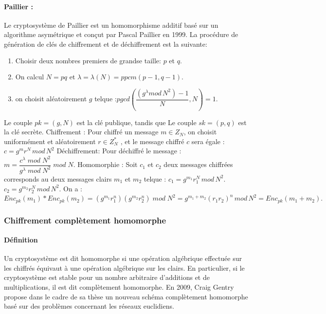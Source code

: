 \documentclass[a4paper,12pt]{article}
\begin{document}
\paragraph{Paillier : }
Le cryptosystème de Paillier est un homomorphisme additif basé sur un algorithme asymétrique et conçut par Pascal Paillier en 1999.\newline
La procédure de génération de clés de chiffrement et de déchiffrement est la suivante:
\begin{enumerate}
\item Choisir deux nombres premiers de grandse taille: $p$   et $q$.
\item  On calcul $N=pq$ \newline et $\lambda =\lambda(N) = ppcm(p-1, q-1)$.
\item  on choisit aléatoirement $g$ telque :\newline $pgcd(\dfrac{(g^\lambda mod\, N^2)-1 }{N}, N) = 1$.\newline
\end{enumerate}
Le couple $pk = (g, N)$ est la clé publique, tandis que Le couple $sk = (p,q)$ est la clé secrète.\newline
Chiffrement :\newline
Pour chiffré un message $m \in Z_N$, on choisit uniformément et aléatoirement $r\in Z^{*}_N$ ,\newline
et le message chiffré $c$ sera égale : $c = g^mr^N\,mod\,N^2$\newline
Déchiffrement:\newline
Pour déchiffré le message : $m = \dfrac{c^\lambda\;mod\;N^2}{g^\lambda\;mod\;N^2}\;mod\;N.$\newline
Homomorphie :\newline
Soit $c_1$ et $c_2$ deux messages chiffrées corresponds au deux messages clairs $m_1$ et $m_2$ telque :\newline
$c_1 = g^{m_1}r_1^N\,mod\,N^2.$\newline
$c_2 = g^{m_2}r_2^N\,mod\,N^2.$\newline
On a :\newline
\newline
$Enc_{pk}(m_1) * Enc_{pk}(m_2) = (g^{m_1}r_1^n)(g^{m_2}r_2^n)\;mod\;N^2 = g^{m_1 + m_2}(r_1r_2)^n\,mod\,N^2 = Enc_{pk}(m_1 + m_2).$\newline
\subsubsection{Chiffrement complètement homomorphe}
          \paragraph{Définition }
Un cryptosystème est dit homomorphe si une opération algébrique effectuée sur les chiffrés équivaut à une opération algébrique sur les clairs. En particulier, si le cryptosystème est stable pour un nombre arbitraire d'additions et de multiplications, il est dit complètement homomorphe.\newline
  En 2009, Craig Gentry propose dans le cadre de sa thèse un nouveau schéma complètement homomorphe basé sur des problèmes concernant les réseaux euclidiens.
\end{document}
